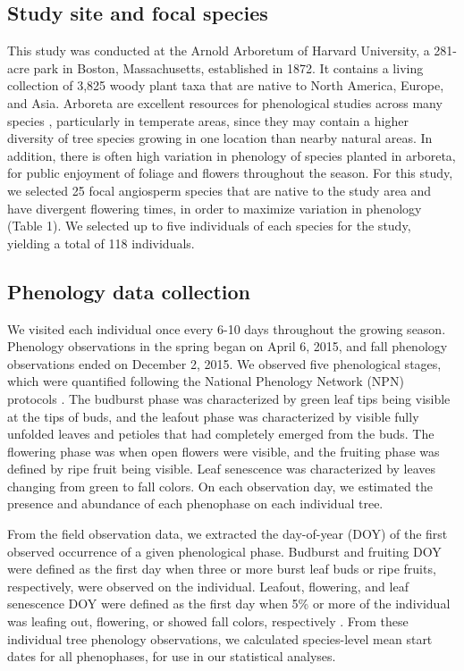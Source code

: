 \documentclass{article}
\begin{document}
\subsection*{Study site and focal species}
This study was conducted at the Arnold Arboretum of Harvard University, a 281-acre park in Boston, Massachusetts, established in 1872. It contains a living collection of 3,825 woody plant taxa that are native to North America, Europe, and Asia. Arboreta are excellent resources for phenological studies across many species \citep [e.g., ][]{primack2009a}, particularly in temperate areas, since they may contain a higher diversity of tree species growing in one location than nearby natural areas. In addition, there is often high variation in phenology of species planted in arboreta, for public enjoyment of foliage and flowers throughout the season. For this study, we selected 25 focal angiosperm species that are native to the study area and have divergent flowering times, in order to maximize variation in phenology (Table 1). We selected up to five individuals of each species for the study, yielding a total of 118 individuals.

\subsection*{Phenology data collection}
We visited each individual once every 6-10 days throughout the growing season. Phenology observations in the spring began on April 6, 2015, and fall phenology observations ended on December 2, 2015. We observed five phenological stages, which were quantified following the National Phenology Network (NPN) protocols \citep[for a full description see][]{denny2014}. The budburst phase was characterized by green leaf tips being visible at the tips of buds, and the leafout phase was characterized by visible fully unfolded leaves and petioles that had completely emerged from the buds. %
The flowering phase was when open flowers were visible, and the fruiting phase was defined by ripe fruit being visible. Leaf senescence was characterized by leaves changing from green to fall colors. On each observation day, we estimated the presence and abundance of each phenophase on each individual tree.
\par From the field observation data, we extracted the day-of-year (DOY) of the first observed occurrence of a given phenological phase. Budburst and fruiting DOY were defined as the first day when three or more burst leaf buds or ripe fruits, respectively, were observed on the individual. Leafout, flowering, and leaf senescence DOY were defined as the first day when 5\% or more of the individual was leafing out,  flowering, or showed fall colors, respectively \citep{denny2014}. 
From these individual tree phenology observations, we calculated species-level mean start dates for all phenophases, for use in our statistical analyses. 
\end{document}
